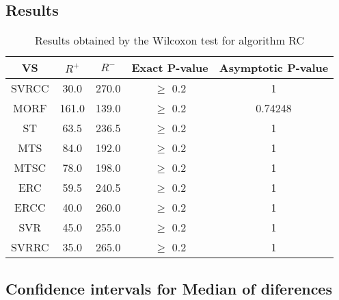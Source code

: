 \documentclass[a4paper,10pt]{article}
\begin{document}
\subsection{Results}

\begin{table}[!htp]
\centering\small
\begin{tabular}{
|c|c|c|c|c|}
\hline
 VS & $R^{+}$ & $R^{-}$ & Exact P-value & Asymptotic P-value \\ \hline 
SVRCC & 30.0 & 270.0 & $\geq$ 0.2 & 1\\ \hline 
MORF & 161.0 & 139.0 & $\geq$ 0.2 & 0.74248\\ \hline 
ST & 63.5 & 236.5 & $\geq$ 0.2 & 1\\ \hline 
MTS & 84.0 & 192.0 & $\geq$ 0.2 & 1\\ \hline 
MTSC & 78.0 & 198.0 & $\geq$ 0.2 & 1\\ \hline 
ERC & 59.5 & 240.5 & $\geq$ 0.2 & 1\\ \hline 
ERCC & 40.0 & 260.0 & $\geq$ 0.2 & 1\\ \hline 
SVR & 45.0 & 255.0 & $\geq$ 0.2 & 1\\ \hline 
SVRRC & 35.0 & 265.0 & $\geq$ 0.2 & 1\\ \hline 

\end{tabular}
\caption{Results obtained by the Wilcoxon test for algorithm RC}
\end{table}

\subsection{Confidence intervals for Median of diferences}
\end{document}
